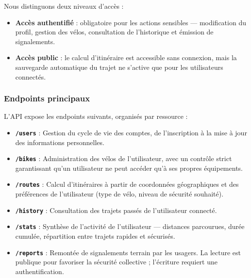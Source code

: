 Nous distinguons deux niveaux d'accès :
\begin{itemize}
    \item \textbf{Accès authentifié} : obligatoire pour les actions sensibles — modification du profil, gestion des vélos, consultation de l'historique et émission de signalements.
    \item \textbf{Accès public} : le calcul d'itinéraire est accessible sans connexion, mais la sauvegarde automatique du trajet ne s'active que pour les utilisateurs connectés.
\end{itemize}

\subsubsection{Endpoints principaux}

L'API expose les endpoints suivants, organisés par ressource :

\begin{itemize}
    \item \textbf{\texttt{/users}} : Gestion du cycle de vie des comptes, de l'inscription à la mise à jour des informations personnelles.
    \item \textbf{\texttt{/bikes}} : Administration des vélos de l'utilisateur, avec un contrôle strict garantissant qu'un utilisateur ne peut accéder qu'à ses propres équipements.
    \item \textbf{\texttt{/routes}} : Calcul d'itinéraires à partir de coordonnées géographiques et des préférences de l'utilisateur (type de vélo, niveau de sécurité souhaité).
    \item \textbf{\texttt{/history}} : Consultation des trajets passés de l'utilisateur connecté.
    \item \textbf{\texttt{/stats}} : Synthèse de l'activité de l'utilisateur — distances parcourues, durée cumulée, répartition entre trajets rapides et sécurisés.
    \item \textbf{\texttt{/reports}} : Remontée de signalements terrain par les usagers. La lecture est publique pour favoriser la sécurité collective ; l'écriture requiert une authentification.
\end{itemize}
